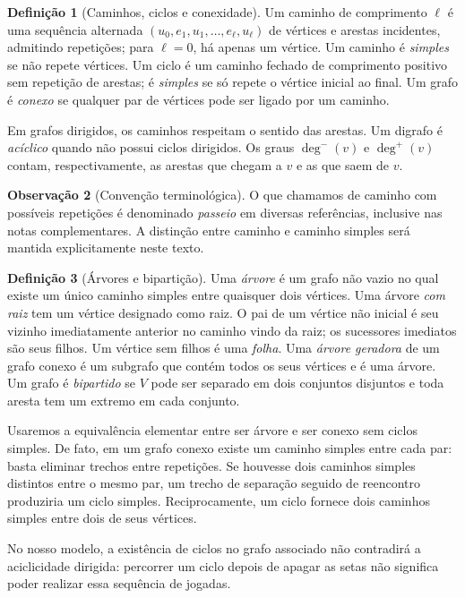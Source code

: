 \documentclass[11pt,a4paper]{article}
\theoremstyle{definition}
\newtheorem{definicao}{Definição}[section]
\newtheorem{observacao}[definicao]{Observação}
\newcommand{\grauout}{\deg^{+}}
\newcommand{\grauin}{\deg^{-}}
\begin{document}
\begin{definicao}[Caminhos, ciclos e conexidade]
Um caminho de comprimento $\ell$ é uma sequência alternada $(u_0,e_1,u_1,\ldots,e_\ell,u_\ell)$ de vértices e arestas incidentes, admitindo repetições; para $\ell=0$, há apenas um vértice. Um caminho é \emph{simples} se não repete vértices. Um ciclo é um caminho fechado de comprimento positivo sem repetição de arestas; é \emph{simples} se só repete o vértice inicial ao final. Um grafo é \emph{conexo} se qualquer par de vértices pode ser ligado por um caminho.
\end{definicao}

Em grafos dirigidos, os caminhos respeitam o sentido das arestas. Um digrafo é \emph{acíclico} quando não possui ciclos dirigidos. Os graus $\grauin(v)$ e $\grauout(v)$ contam, respectivamente, as arestas que chegam a $v$ e as que saem de $v$.

\begin{observacao}[Convenção terminológica]
O que chamamos de caminho com possíveis repetições é denominado \emph{passeio} em diversas referências, inclusive nas notas complementares. A distinção entre caminho e caminho simples será mantida explicitamente neste texto.
\end{observacao}

\begin{definicao}[Árvores e bipartição]
Uma \emph{árvore} é um grafo não vazio no qual existe um único caminho simples entre quaisquer dois vértices. Uma árvore \emph{com raiz} tem um vértice designado como raiz. O pai de um vértice não inicial é seu vizinho imediatamente anterior no caminho vindo da raiz; os sucessores imediatos são seus filhos. Um vértice sem filhos é uma \emph{folha}. Uma \emph{árvore geradora} de um grafo conexo é um subgrafo que contém todos os seus vértices e é uma árvore. Um grafo é \emph{bipartido} se $V$ pode ser separado em dois conjuntos disjuntos e toda aresta tem um extremo em cada conjunto.
\end{definicao}

Usaremos a equivalência elementar entre ser árvore e ser conexo sem ciclos simples. De fato, em um grafo conexo existe um caminho simples entre cada par: basta eliminar trechos entre repetições. Se houvesse dois caminhos simples distintos entre o mesmo par, um trecho de separação seguido de reencontro produziria um ciclo simples. Reciprocamente, um ciclo fornece dois caminhos simples entre dois de seus vértices.

No nosso modelo, a existência de ciclos no grafo associado não contradirá a aciclicidade dirigida: percorrer um ciclo depois de apagar as setas não significa poder realizar essa sequência de jogadas.
\end{document}
